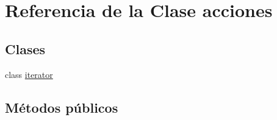 \hypertarget{classacciones}{}\section{Referencia de la Clase acciones}
\label{classacciones}
\subsection*{Clases}
\begin{DoxyCompactItemize}
\item 
class \hyperlink{classacciones_1_1iterator}{iterator}
\end{DoxyCompactItemize}
\subsection*{Métodos públicos}
